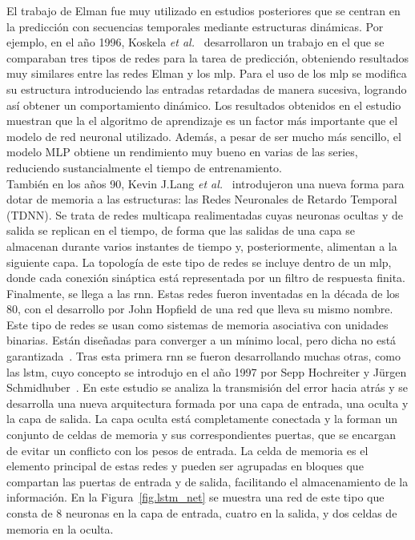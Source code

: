 El trabajo de Elman fue muy utilizado en estudios posteriores que se centran en la predicción con secuencias temporales mediante estructuras dinámicas. Por ejemplo, en el año 1996, Koskela \textit{et al.}~\cite{koskela1996time} desarrollaron un trabajo en el que se comparaban tres tipos de redes para la tarea de predicción, obteniendo resultados muy similares entre las redes Elman y los \acrshort{mlp}. Para el uso de los \acrshort{mlp} se modifica su estructura introduciendo las entradas retardadas de manera sucesiva, logrando así obtener un comportamiento dinámico. Los resultados obtenidos en el estudio muestran que la el algoritmo de aprendizaje es un factor más importante que el modelo de red neuronal utilizado. Además, a pesar de ser mucho más sencillo, el modelo MLP obtiene un rendimiento muy bueno en varias de las series, reduciendo sustancialmente el tiempo de entrenamiento.\\

También en los años 90, Kevin J.Lang \textit{et al.}~\cite{LANG199023} introdujeron una nueva forma para dotar de memoria a las estructuras: las Redes Neuronales de Retardo Temporal (TDNN). Se trata de redes multicapa realimentadas cuyas neuronas ocultas y de salida se replican en el tiempo, de forma que las salidas de una capa se almacenan durante varios instantes de tiempo y, posteriormente, alimentan a la siguiente capa. La topología de este tipo de redes se incluye dentro de un \acrshort{mlp}, donde cada conexión sináptica está representada por un filtro de respuesta finita.\\

Finalmente, se llega a las \acrshort{rnn}. Estas redes fueron inventadas en la década de los 80, con el desarrollo por John Hopfield de una red que lleva su mismo nombre. Este tipo de redes se usan como sistemas de memoria asociativa con unidades binarias. Están diseñadas para converger a un mínimo local, pero dicha no está garantizada~\cite{Hopfield:2007}. Tras esta primera \acrshort{rnn} se fueron desarrollando muchas otras, como las \acrshort{lstm}, cuyo concepto se introdujo en el año 1997 por Sepp Hochreiter y Jürgen Schmidhuber~\cite{hochreiter1997long}. En este estudio se analiza la transmisión del error hacia atrás y se desarrolla una nueva arquitectura formada por una capa de entrada, una oculta y la capa de salida. La capa oculta está completamente conectada y la forman un conjunto de celdas de memoria y sus correspondientes puertas, que se encargan de evitar un conflicto con los pesos de entrada. La celda de memoria es el elemento principal de estas redes y pueden ser agrupadas en bloques que compartan las puertas de entrada y de salida, facilitando el almacenamiento de la información. En la Figura~\ref{fig.lstm_net} se muestra una red de este tipo que consta de 8 neuronas en la capa de entrada, cuatro en la salida, y dos celdas de memoria en la oculta.\\

